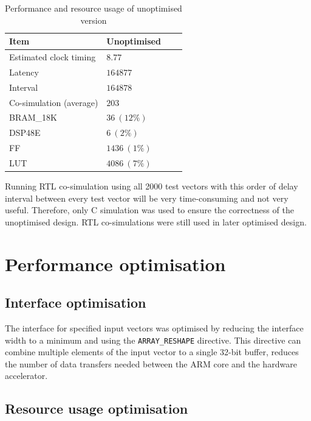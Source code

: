 \documentclass[journal]{IEEEtran}
\begin{document}
\begin{table}[ht]
	\renewcommand{\arraystretch}{1.3}
	\caption{Performance and resource usage of unoptimised version}
	\label{tbl:res_unopt}
	\centering
	\begin{tabular}{llll}
		\hline
		Item			& Unoptimised	\\
		\hline
		Estimated clock timing	& $8.77$	\\
		Latency			& $164877$	\\
		Interval		& $164878$	\\
		Co-simulation (average)	& $203$		\\
		\hline
		BRAM\_18K		& $36~(12\%)$	\\
		DSP48E			& $6~(2\%)$	\\
		FF			& $1436~(1\%)$	\\
		LUT			& $4086~(7\%)$	\\
		\hline
	\end{tabular}
\end{table}

Running RTL co-simulation using all 2000 test vectors with this order of delay interval between every test vector will be very time-consuming and not very useful. Therefore, only C simulation was used to ensure the correctness of the unoptimised design. RTL co-simulations were still used in later optimised design.

\section{Performance optimisation}

\subsection{Interface optimisation}

The interface for specified input vectors was optimised by reducing the interface width to a minimum and using the \texttt{ARRAY\_RESHAPE} directive. This directive can combine multiple elements of the input vector to a single 32-bit buffer, reduces the number of data transfers needed between the ARM core and the hardware accelerator.

\subsection{Resource usage optimisation}
\end{document}
